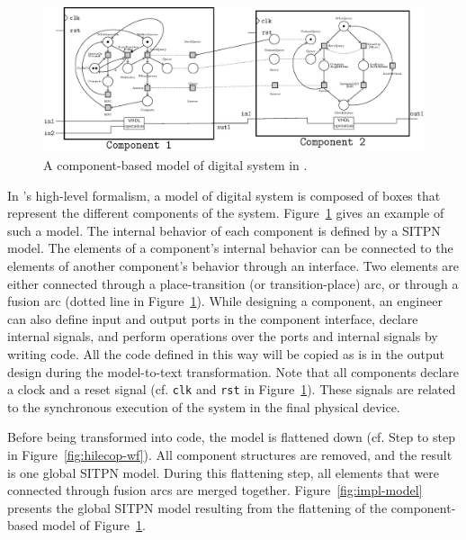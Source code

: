 \documentclass[pdflatex,sn-mathphys]{sn-jnl}%
\theoremstyle{thmstyleone}%
\theoremstyle{thmstyletwo}%
\theoremstyle{thmstylethree}%
\begin{document}
\begin{figure}[H]
\centering
\includegraphics[keepaspectratio=true,width=\textwidth]{abs-model.eps}
\caption[An example of model of digital system in \hilecop{}.]{A
  component-based model of digital system in \hilecop{}.}
\label{fig:abs-model}
\end{figure}

In \hilecop{}'s high-level formalism, a model of digital system is
composed of boxes that represent the different components of the
system. Figure~\ref{fig:abs-model} gives an example of such a model.
The internal behavior of each component is defined by a SITPN model.
The elements of a component's internal behavior can be connected to
the elements of another component's behavior through an interface. Two
elements are either connected through a place-transition (or
transition-place) arc, or through a fusion arc (dotted line in
Figure~\ref{fig:abs-model}). While designing a component, an engineer
can also define input and output ports in the component interface,
declare internal signals, and perform operations over the ports and
internal signals by writing \vhdl{} code. All the \vhdl{} code defined
in this way will be copied as is in the output \vhdl{} design during
the model-to-text transformation. Note that all components declare a
clock and a reset signal (cf. \texttt{clk} and \texttt{rst} in
Figure~\ref{fig:abs-model}). These signals are related to the
synchronous execution of the system in the final physical device.

Before being transformed into \vhdl{} code, the model is flattened
down (cf. Step  to step  in
Figure~\ref{fig:hilecop-wf}). All component structures are removed,
and the result is one global SITPN model. During this flattening step,
all elements that were connected through fusion arcs are merged
together. Figure~\ref{fig:impl-model} presents the global SITPN model
resulting from the flattening of the component-based model of
Figure~\ref{fig:abs-model}.
\end{document}
